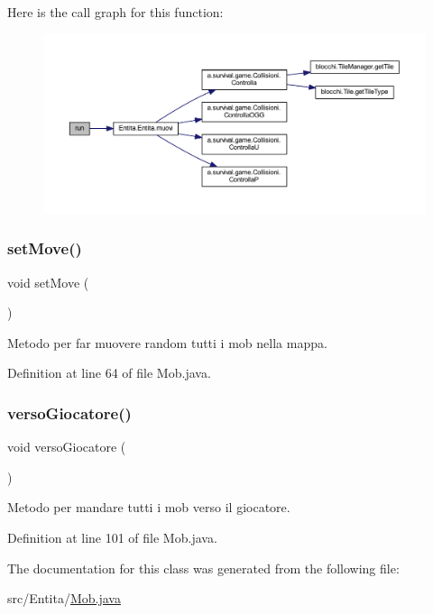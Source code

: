Here is the call graph for this function\+:
\nopagebreak
\begin{figure}[H]
\begin{center}
\leavevmode
\includegraphics[width=350pt]{class_entita_1_1_mob_a13a43e6d814de94978c515cb084873b1_cgraph}
\end{center}
\end{figure}
\mbox{\label{class_entita_1_1_mob_a447f807a76b7ea97a78cb76241fe8bc8}} 
\subsubsection{\texorpdfstring{set\+Move()}{setMove()}}
{\footnotesize\ttfamily void set\+Move (\begin{DoxyParamCaption}{ }\end{DoxyParamCaption})}



Metodo per far muovere random tutti i mob nella mappa. 



Definition at line 64 of file Mob.\+java.

\mbox{\label{class_entita_1_1_mob_a52258fe2687e7c05d4c65a1f4714b0c5}} 
\subsubsection{\texorpdfstring{verso\+Giocatore()}{versoGiocatore()}}
{\footnotesize\ttfamily void verso\+Giocatore (\begin{DoxyParamCaption}{ }\end{DoxyParamCaption})}



Metodo per mandare tutti i mob verso il giocatore. 



Definition at line 101 of file Mob.\+java.



The documentation for this class was generated from the following file\+:\begin{DoxyCompactItemize}
\item 
src/\+Entita/\hyperlink{_mob_8java}{Mob.\+java}\end{DoxyCompactItemize}

